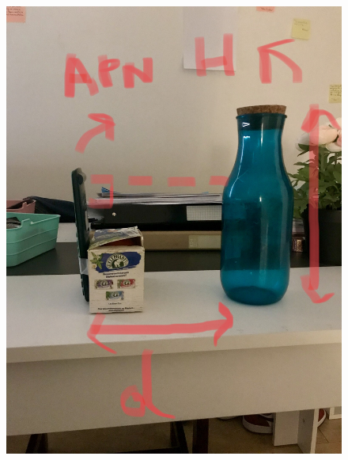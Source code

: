 \documentclass[12pt,a4paper]{article}
\begin{document}
\begin{figure}[H]
\begin{center}
	{\includegraphics[scale=0.125]{Figures/s1.jpg}}
\hspace*{\fill}

\end{center}
\end{figure}
\end{document}
